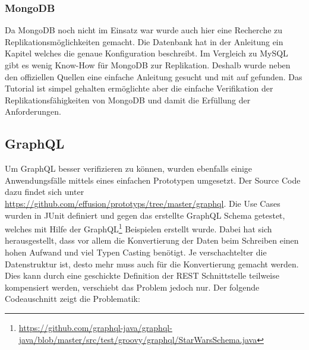 \subsubsection{MongoDB}

Da MongoDB noch nicht im Einsatz war wurde auch hier eine Recherche zu Replikationsmöglichkeiten gemacht. Die Datenbank hat in der Anleitung ein Kapitel \cite{mongorep} welches die genaue Konfiguration beschreibt. Im Vergleich zu MySQL gibt es wenig Know-How für MongoDB zur Replikation. Deshalb wurde neben den offiziellen Quellen eine einfache Anleitung gesucht und mit \cite{mongorep2} auf gefunden. Das Tutorial ist simpel gehalten ermöglichte aber die einfache Verifikation der Replikationsfähigkeiten von MongoDB und damit die Erfüllung der Anforderungen.
\newpage

\subsection{GraphQL}

Um GraphQL besser verifizieren zu können, wurden ebenfalls einige Anwendungsfälle mittels eines einfachen Prototypen umgesetzt. Der Source Code dazu findet sich unter \url{https://github.com/effusion/prototyps/tree/master/graphql}. Die Use Cases wurden in JUnit definiert und gegen das erstellte GraphQL Schema getestet, welches mit Hilfe der GraphQL\footnote{\url{https://github.com/graphql-java/graphql-java/blob/master/src/test/groovy/graphql/StarWarsSchema.java}} Beispielen erstellt wurde. Dabei hat sich herausgestellt, dass vor allem die Konvertierung der Daten beim Schreiben einen hohen Aufwand und viel Typen Casting benötigt. Je verschachtelter die Datenstruktur ist, desto mehr muss auch für die Konvertierung gemacht werden. Dies kann durch eine geschickte Definition der REST Schnittstelle teilweise kompensiert werden, verschiebt das Problem jedoch nur. Der folgende Codeauschnitt zeigt die Problematik:

